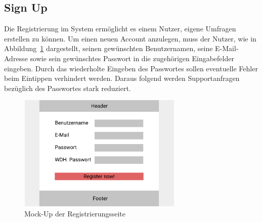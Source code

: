 \subsection{Sign Up}
\label{ssec:konzept:client:signup}
Die Registrierung im System ermöglicht es einem Nutzer, eigene Umfragen erstellen zu können.
Um einen neuen Account anzulegen, muss der Nutzer, wie in Abbildung~\ref{fig:MockSignup} dargestellt, seinen gewünschten Benutzernamen, seine E-Mail-Adresse sowie sein gewünschtes Passwort in die zugehörigen Eingabefelder eingeben.
Durch das wiederholte Eingeben des Passwortes sollen eventuelle Fehler beim Eintippen verhindert werden.
Daraus folgend werden Supportanfragen bezüglich des Passwortes stark reduziert.

\begin{figure}[H]
	\centering
	\includegraphics[width=0.7\textwidth]{img/konzeption/client/register}
	\captionsetup{justification=centering, format=plain}
	\caption[Mock-Up der Registrierungsseite]{Mock-Up der Registrierungsseite \\\figma}
	\label{fig:MockSignup}
\end{figure}
